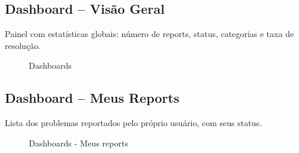 \documentclass[12pt,a4paper]{article}
\begin{document}
\subsection{Dashboard – Visão Geral}
Painel com estatísticas globais: número de reports, status, categorias e taxa de resolução.

\begin{figure}[H]
\centering
{}
\caption{Dashboards}
\end{figure}

\subsection{Dashboard – Meus Reports}
Lista dos problemas reportados pelo próprio usuário, com seus status.

\begin{figure}[H]
\centering
{}
\caption{Dashboards - Meus reports}
\end{figure}
\end{document}
